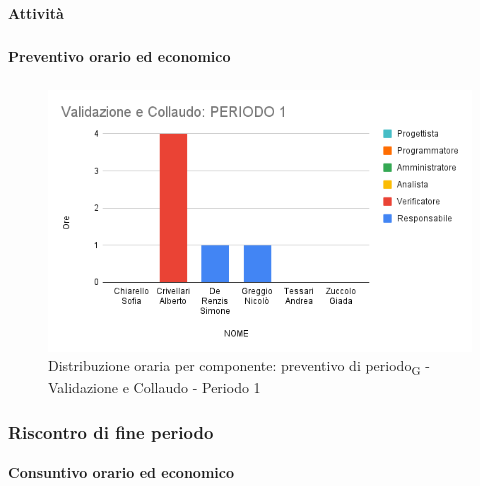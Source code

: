 \paragraph{Attività}
\subparagraph*{}

\planningTable{
	
}



\paragraph{Preventivo orario ed economico}
\subparagraph*{}

\contabilitaTable{
	
}

\begin{figure}[H]
	\centering
	\includegraphics[scale=0.6]{res/images/charts/preventivo/valid_1.png}
	\caption{Distribuzione oraria per componente: preventivo di periodo\textsubscript{G} - Validazione e Collaudo - Periodo 1}
\end{figure}



\subsubsection{Riscontro di fine periodo}


\paragraph{Consuntivo orario ed economico}
\subparagraph*{}

\contabilitaTable{
	
}

